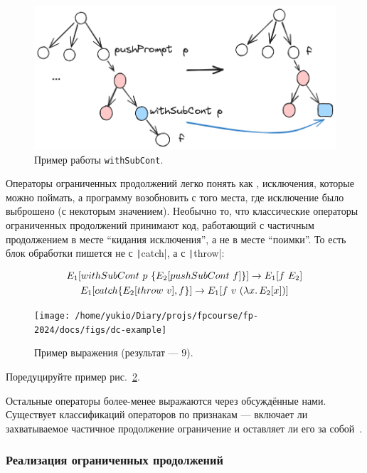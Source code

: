 \begin{figure}[h]
    \centering
    \includegraphics[width=0.7\linewidth]{figs/push-prompt}
    \caption{Пример работы \texttt{withSubCont}.}
    \label{fig:push-prompt}
\end{figure}

Операторы ограниченных продолжений легко понять как , исключения, которые можно поймать, а программу возобновить с того места, где исключение было выброшено (с некоторым значением).
Необычно то, что классические операторы ограниченных продолжений принимают код, работающий с частичным продолжением в месте ``кидания исключения'', а не в месте ``поимки''.
То есть блок обработки пишется не с \texttt|catch|, а с \texttt|throw|:

\begin{gather*}
    E_1[withSubCont ~ p ~ \{E_2[pushSubCont ~ f]\}] \to E_1[f ~ E_2]
    \\
    E_1[catch\{E_2[throw ~ v], f\}] \to E_1[f ~ v ~ (\lambda x\ldotp E_2[x])]
\end{gather*}

\begin{figure}[h]
    \centering
    \texttt{[image: /home/yukio/Diary/projs/fpcourse/fp-2024/docs/figs/dc-example]}
    \caption{Пример выражения (результат --- $9$).}
    \label{fig:dc-example}
\end{figure}

\begin{task}
    Поредуцируйте пример рис.~\ref{fig:dc-example}.
\end{task}

Остальные операторы более-менее выражаются через обсуждённые нами.
Существует классификаций операторов по признакам --- включает ли захватываемое частичное продолжение ограничение и оставляет ли его за собой~\cite{dyvbig2007monadic}.

\subsubsection{Реализация ограниченных продолжений}

